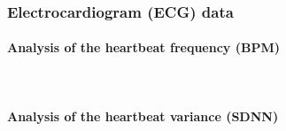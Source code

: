 \subsubsection{Electrocardiogram (ECG) data}
\label{subsubsec:results_ecg_2}

\paragraph{Analysis of the heartbeat frequency (BPM)}\mbox{}\\



%
%
\paragraph{Analysis of the heartbeat variance (SDNN)}\mbox{}\\
%
